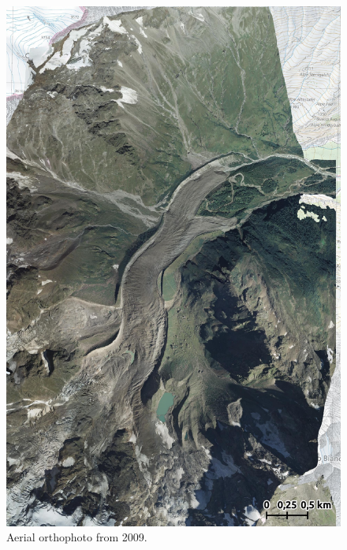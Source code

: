 \begin{figure}[p]
    \centering
    \includegraphics[height=\textheight]{figures/appendix/orto_2009.jpg}
    \caption{Aerial orthophoto from 2009.}
\end{figure}

